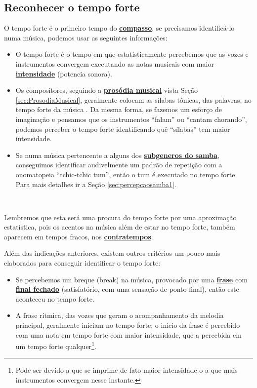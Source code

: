 \subsection{Reconhecer o tempo forte}
\label{subsec:perceberTF1}
O tempo forte é o primeiro tempo do \hyperref[def:Compasso]{\textbf{compasso}},
se precisamos identificá-lo numa música, podemos usar as seguintes informações:
\begin{itemize}
\item O tempo forte é o tempo em que estatisticamente percebemos que as vozes e 
instrumentos convergem executando as notas musicais com maior  \hyperref[sec:pos:Intensidade]{\textbf{intensidade}}  (potencia sonora). 
\item Os compositores, seguindo a \hyperref[sec:ProsodiaMusical]{\textbf{prosódia musical}} vista Seção \ref{sec:ProsodiaMusical}, 
geralmente colocam as sílabas tônicas, das palavras, no tempo forte da música  \cite[pp. 149]{medteoria}. 
Da mesma forma, se fazemos um esforço de imaginação e pensamos que os instrumentos ``falam'' ou ``cantam chorando'',
podemos perceber o tempo forte identificando quê ``sílabas'' tem maior intensidade.
\item Se numa música pertencente a alguns dos \hyperref[sec:FamiliaSamba]{\textbf{subgeneros do samba}}, 
conseguimos identificar audivelmente  um padrão de repetição com a onomatopeia ``tchic-tchic tum'', 
então o tum é executado no tempo forte. 
Para mais detalhes ir a Seção \ref{sec:percepcaosamba1}.
\end{itemize}~


Lembremos que esta será uma procura do tempo forte por uma aproximação estatística, 
pois os acentos na música além de estar no tempo forte, 
também aparecem em tempos fracos, nos \hyperref[sec:contratempo]{\textbf{contratempos}}.


Além das indicações anteriores, 
existem outros critérios um pouco mais elaborados para conseguir identificar o tempo forte:
\begin{itemize}
\item Se percebemos um breque (break) na música, 
provocado por uma \hyperref[sec:Frase]{\textbf{frase}} com \hyperref[subsec:FinalAbertoFechado]{\textbf{final fechado}} 
(satisfatório, com uma sensação de ponto final), então este aconteceu no tempo forte.
\item A frase rítmica, das vozes que geram o acompanhamento da melodia principal,
geralmente iniciam no tempo forte; 
o inicio da frase é percebido com uma nota em tempo forte com maior intensidade, 
que a percebida em um tempo forte qualquer\footnote{Pode ser
devido a que se imprime de fato maior intensidade o a que mais instrumentos convergem nesse instante.}.
\end{itemize}




